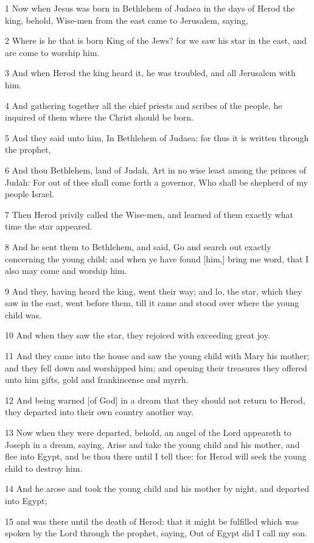 \par 1 Now when Jesus was born in Bethlehem of Judaea in the days of Herod the king, behold, Wise-men from the east came to Jerusalem, saying,
\par 2 Where is he that is born King of the Jews? for we saw his star in the east, and are come to worship him.
\par 3 And when Herod the king heard it, he was troubled, and all Jerusalem with him.
\par 4 And gathering together all the chief priests and scribes of the people, he inquired of them where the Christ should be born.
\par 5 And they said unto him, In Bethlehem of Judaea: for thus it is written through the prophet,
\par 6 And thou Bethlehem, land of Judah, Art in no wise least among the princes of Judah: For out of thee shall come forth a governor, Who shall be shepherd of my people Israel.
\par 7 Then Herod privily called the Wise-men, and learned of them exactly what time the star appeared.
\par 8 And he sent them to Bethlehem, and said, Go and search out exactly concerning the young child; and when ye have found [him,] bring me word, that I also may come and worship him.
\par 9 And they, having heard the king, went their way; and lo, the star, which they saw in the east, went before them, till it came and stood over where the young child was.
\par 10 And when they saw the star, they rejoiced with exceeding great joy.
\par 11 And they came into the house and saw the young child with Mary his mother; and they fell down and worshipped him; and opening their treasures they offered unto him gifts, gold and frankincense and myrrh.
\par 12 And being warned [of God] in a dream that they should not return to Herod, they departed into their own country another way.
\par 13 Now when they were departed, behold, an angel of the Lord appeareth to Joseph in a dream, saying, Arise and take the young child and his mother, and flee into Egypt, and be thou there until I tell thee: for Herod will seek the young child to destroy him.
\par 14 And he arose and took the young child and his mother by night, and departed into Egypt;
\par 15 and was there until the death of Herod: that it might be fulfilled which was spoken by the Lord through the prophet, saying, Out of Egypt did I call my son.
